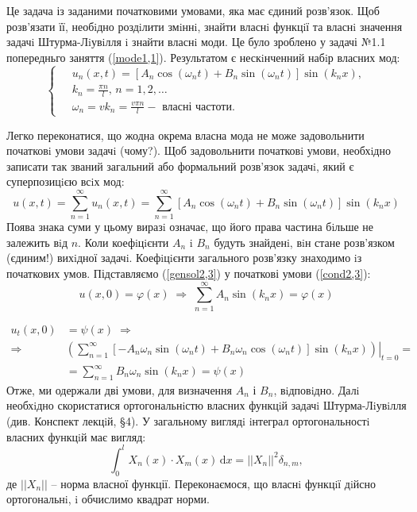 Це задача із заданими початковими умовами, яка має єдиний розв'язок. Щоб розв’язати її, необiдно роздiлити змiннi, знайти власнi функцiї та власнi значення задачi Штурма-Лiувiлля i знайти власнi моди. Це було зроблено у  задачі №1.1 попередньго заняття (\ref{mode1,1}). Результатом є нескiнченний набiр власних мод: 
\begin{equation}
    \left\{ \begin{aligned} \label{mode2,3}
        \;&u_n(x,t) = \left[A_n\cos(\omega_n t) + B_n\sin(\omega_n t)\right] \sin(k_n x), \\
        &k_n = \frac{\pi n}{l}, \, n = 1, 2,\ldots\\
        &\omega_n = vk_n = \frac{v \pi n}{l} - \text{ власні частоти}.
    \end{aligned}\right.
\end{equation}

Легко переконатися, що жодна окрема власна мода не може задовольнити початковi умови задачi (чому?). Щоб задовольнити початковi умови, необхiдно записати так званий загальний або формальний розв’язок задачi, який є суперпозицiєю всiх мод:
\begin{equation} \label{gensol2,3}
    u(x,t) = \sum^{\infty}_{n=1} u_n(x,t) = \sum^{\infty}_{n=1} \left[A_n\cos(\omega_n t) + B_n\sin(\omega_n t)\right] \sin(k_n x)
\end{equation}
Поява знака суми у цьому виразi означає, що його права частина бiльше не залежить вiд $n$. Коли коефiцiєнти $A_n$ i $B_n$ будуть знайденi, вiн стане розв’язком (єдиним!) вихiдної задачi. Коефiцiєнти загального розв’язку знаходимо iз початкових умов. Підставляємо (\ref{gensol2,3}) у початкові умови (\ref{cond2,3}):
\begin{equation} \label{init-pos2,3}
    u(x,0) = \varphi(x) \;\Rightarrow\; \sum^{\infty}_{n=1} A_n\sin(k_n x) = \varphi(x)
\end{equation}

\begin{equation} \label{init-vel2,3}
    \begin{aligned}
        u_t(x,0) &= \psi(x)
        \;\Rightarrow\\
        \Rightarrow& \left.\left(\sum^{\infty}_{n=1}\left[-A_n\omega_n\sin(\omega_n t) + B_n\omega_n\cos(\omega_n t)\right] \sin(k_n x)\right)\right|_{t=0} =\\
        &= \sum^{\infty}_{n=1} B_n\omega_n\sin(k_n x) = \psi(x)
    \end{aligned}
\end{equation}
Отже, ми одержали дві умови, для визначення $A_n$ і $B_n$, вiдповiдно. Далi необхiдно скористатися ортогональнiстю власних функцiй задачi Штурма-Лiувiлля (див. Конспект лекцiй, §4). У загальному виглядi iнтеграл ортогональностi власних функцiй має вигляд:
\begin{equation} \label{orth2,3}
    \int_0^l X_n(x) \cdot X_m(x) \,\mathrm{d}x = ||X_n||^2\delta_{n,m},
\end{equation}
де $||X_n||$ -- норма власної функції. Переконаємося, що власнi функцiї дiйсно ортогональнi, i обчислимо квадрат норми.

